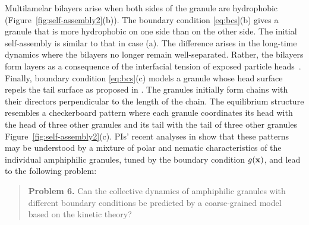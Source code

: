 Multilamelar bilayers arise when both sides of the granule
are hydrophobic (Figure~\ref{fig:self-assembly2}(b)).
The boundary condition \eqref{eq:bcs}(b) 
gives a granule that is more hydrophobic 
on one side than on the other side.
The initial self-assembly is similar to that in case (a).
The difference arises in the long-time dynamics where the bilayers
no longer remain well-separated. 
Rather, the bilayers form layers 
as a consequence of the interfacial tension of exposed particle
heads~\cite{Huetal19, deMeetal21}. 
%
Finally, boundary condition \eqref{eq:bcs}(c) models 
a granule whose head surface repels the tail surface as proposed in
\cite{MaRa76, Ma77}.
The granules initially form chains with their directors perpendicular to the
length of the chain. The equilibrium structure
resembles a checkerboard pattern
where each granule coordinates
its head with the head of three other granules and its tail with the
tail of three other granules Figure~\ref{fig:self-assembly2}(c).
%
PIs' recent analyses in \cite{fu-ryh-qua-you2022} show that these patterns may be understood by a mixture of polar and nematic characteristics of the individual amphiphilic granules, 
tuned by the boundary condition $g({\bf x})$, and lead to the following problem:
%
\begin{quotation}
  \noindent
  \textbf{Problem 6.} Can the collective dynamics of amphiphilic granules with different boundary conditions 
be predicted by a coarse-grained model based on the kinetic theory?
\end{quotation}
%
